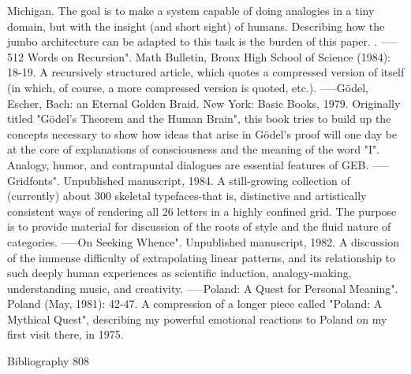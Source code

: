   Michigan. The goal is to make a system capable of doing analogies in a tiny domain, but
  with the insight (and short sight) of humans. Describing how the jumbo architecture can be
  adapted to this task is the burden of this paper. .
-----512 Words on Recursion". Math Bulletin, Bronx High School of Science (1984): 18-19.
  A recursively structured article, which quotes a compressed version of itself (in which, of
  course, a more compressed version is quoted, etc.).
-----Gödel, Escher, Bach: an Eternal Golden Braid. New York: Basic Books, 1979. Originally
  titled "Gödel’s Theorem and the Human Brain", this book tries to build up the concepts
  necessary to show how ideas that arise in Gödel’s proof will one day be at the core of
  explanations of consciousness and the meaning of the word "I". Analogy, humor, and
  contrapuntal dialogues are essential features of GEB.
-----Gridfonts". Unpublished manuscript, 1984. A still-growing collection of (currently) about
  300 skeletal typefaces-that is, distinctive and artistically consistent ways of rendering all 26
  letters in a highly confined grid. The purpose is to provide material for discussion of the
  roots of style and the fluid nature of categories.
-----On Seeking Whence". Unpublished manuscript, 1982. A discussion of the immense
  difficulty of extrapolating linear patterns, and its relationship to such deeply human
  experiences as scientific induction, analogy-making, understanding music, and creativity.
-----Poland: A Quest for Personal Meaning". Poland (May, 1981): 42-47. A compression of a
  longer piece called "Poland: A Mythical Quest", describing my powerful emotional
  reactions to Poland on my first visit there, in 1975.

Bibliography                                                                                 808

